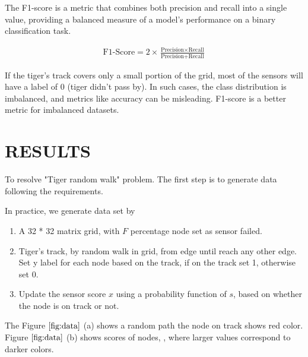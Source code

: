 \documentclass{article}
\begin{document}
The F1-score is a metric that combines both precision and recall into a single value, providing a balanced measure of a model's performance on a binary classification task.

\begin{align}
  \text{F1-Score} = 2 \times \frac{\text{Precision} \times \text{Recall}}{\text{Precision} + \text{Recall}}
\end{align}

If the tiger's track covers only a small portion of the grid, most of the sensors will have a label of 0 (tiger didn't pass by). In such cases, the class distribution is imbalanced, and metrics like accuracy can be misleading. F1-score is a better metric for imbalanced datasets.

\section{RESULTS}
\label{sec:results}

To resolve "Tiger random walk" problem. 
The first step is to generate data following the requirements.

In practice, we generate data set by

\begin{enumerate}
  \item A 32 * 32 matrix grid, with $F$ percentage node set as sensor failed.
  \item Tiger's track, by random walk in grid, from edge until reach any other edge.
        \\ Set y label for each node based on the track, if on the track set 1, otherwise set 0.
  \item Update the sensor score $x$ using a probability function of $s$, based on whether the node is on track or not.
\end{enumerate}

The Figure $\ref{fig:data}$ (a) shows a random path the node on track shows red color.
Figure $\ref{fig:data}$ (b) shows scores of nodes, , where larger values correspond to darker colors.
\end{document}
